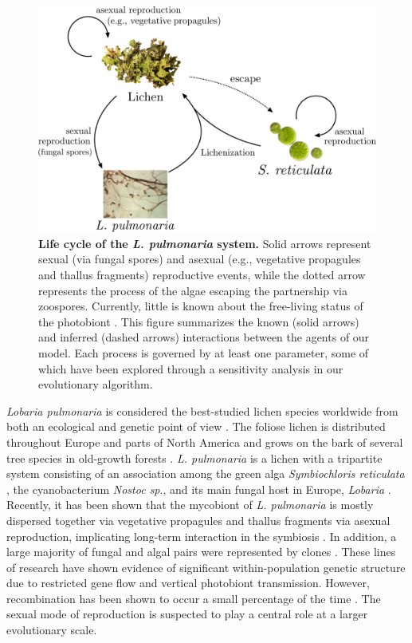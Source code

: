 \documentclass[fleqn,10pt]{wlscirep}
\begin{document}
\begin{figure}
\centering
\includegraphics[width=.6\textwidth]{img/interaction_scheme}
\caption{{\bf Life cycle of the {\em L. pulmonaria} system.} Solid arrows represent sexual (via fungal spores) and asexual (e.g., vegetative propagules and thallus fragments) reproductive events, while the dotted arrow represents the process of the algae escaping the partnership via zoospores. Currently, little is known about the free-living status of the photobiont \cite{dal2011phylogeny}. This figure summarizes the known (solid arrows) and inferred (dashed arrows) interactions between the agents of our model. Each process is governed by at least one parameter, some of which have been explored through a sensitivity analysis in our evolutionary algorithm.}
\end{figure}

\textit{Lobaria pulmonaria} is considered the best-studied lichen species worldwide from both an ecological and genetic point of view \cite{grube2012exploring}. The foliose lichen is distributed throughout Europe and parts of North America and grows on the bark of several tree species in old-growth forests \cite{yoshimura1971genus}. \textit{L. pulmonaria} is a lichen with a tripartite system consisting of an association among the green alga \textit{Symbiochloris reticulata} \cite{vskaloud2016taxonomic}, the cyanobacterium \textit{Nostoc sp}., and its main fungal host in Europe, \textit{Lobaria} \cite{dal2011phylogeny} . Recently, it has been shown that the mycobiont of \textit{L. pulmonaria} is mostly dispersed together via vegetative propagules and thallus fragments via asexual reproduction\cite{werth2006effect}, implicating long-term interaction in the symbiosis \cite{walser2001species,werth2006effect,dal2012vertical,werth2012congruent}. In addition, a large majority of fungal and algal pairs were represented by clones \cite{dal2012vertical}. These lines of research have shown evidence of significant within-population genetic structure due to restricted gene flow and vertical photobiont transmission. However, recombination has been shown to occur a small percentage of the time \cite{dal2012vertical}. The sexual mode of reproduction is suspected to play a central role at a larger evolutionary scale. 
\end{document}

